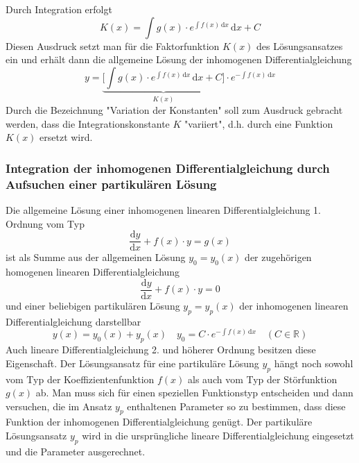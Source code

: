Durch Integration erfolgt
\begin{equation}
\boxed{K\left(x\right)=\displaystyle \int g\left(x\right)\cdot e^{\displaystyle \int f\left(x\right)\,\text{d}x}\,\text{d}x+C}
\end{equation}
Diesen Ausdruck setzt man für die Faktorfunktion $K\left(x\right)$ des Lösungsansatzes ein und erhält dann die allgemeine Lösung der inhomogenen Differentialgleichung
\begin{equation}
\boxed{y=\underbrace{\Big[\displaystyle \int g\left(x\right)\cdot e^{\displaystyle \int f\left(x\right)\,\text{d}x}\,\text{d}x+C\Big]}_{K\left(x\right)}\cdot e^{-\displaystyle \int f\left(x\right)\,\text{d}x}}
\end{equation}
Durch die Bezeichnung "Variation der Konstanten" soll zum Ausdruck gebracht werden, dass die Integrationskonstante $K$ "variiert", d.h. durch eine Funktion $K\left(x\right)$ ersetzt wird.
\subsubsection{Integration der inhomogenen Differentialgleichung durch Aufsuchen einer partikulären Lösung}
Die allgemeine Lösung einer inhomogenen linearen Differentialgleichung 1. Ordnung vom Typ
\begin{equation}
\boxed{\dfrac{\text{d}y}{\text{d}x}+f\left(x\right)\cdot y=g\left(x\right)}
\end{equation}
ist als Summe aus der allgemeinen Lösung $y_0=y_0\left(x\right)$ der zugehörigen homogenen linearen Differentialgleichung
\begin{equation}
\boxed{\dfrac{\text{d}y}{\text{d}x}+f\left(x\right)\cdot y=0}
\end{equation}
und einer beliebigen partikulären Lösung $y_p=y_p\left(x\right)$ der inhomogenen linearen Differentialgleichung darstellbar
\begin{equation}
\boxed{y\left(x\right)=y_0\left(x\right)+y_p\left(x\right)}\quad \boxed{y_0=C\cdot e^{-\displaystyle \int f\left(x\right)\,\text{d}x}\quad \left(C\in \mathbb{R}\right)}
\end{equation}
Auch lineare Differentialgleichung 2. und höherer Ordnung besitzen diese Eigenschaft. Der Lösungsansatz für eine partikuläre Lösung $y_p$ hängt noch sowohl vom Typ der Koeffizientenfunktion $f\left(x\right)$ als auch vom Typ der Störfunktion $g\left(x\right)$ ab. Man muss sich für einen speziellen Funktionstyp entscheiden und dann versuchen, die im Ansatz $y_p$ enthaltenen Parameter so zu bestimmen, dass diese Funktion der inhomogenen Differentialgleichung genügt. Der partikuläre Lösungsansatz $y_p$ wird in die ursprüngliche lineare Differentialgleichung eingesetzt und die Parameter ausgerechnet. 
